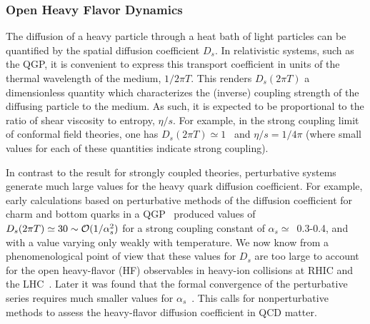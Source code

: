 \subsubsection{Open Heavy Flavor Dynamics}
	\label{Sec:OpenHF}

 The diffusion of a heavy particle through a heat bath of light particles can be 
 quantified by the spatial diffusion coefficient $D_s$. In 
 relativistic systems, such as the QGP, it is convenient to express this transport 
 coefficient in units of the thermal wavelength of the medium, $1/2\pi T$. This renders 
 $D_s(2\pi T)$ a dimensionless quantity which characterizes the (inverse) coupling 
 strength of the diffusing particle to the medium. As such, it is expected to be 
 proportional to the ratio of shear viscosity to entropy, $\eta/s$. For example, in 
 the strong coupling limit of conformal field theories, one has 
 $D_s(2\pi T) \simeq 1$~\cite{Herzog:2006gh,CasalderreySolana:2006rq} and 
 $\eta/s=1/4\pi$ (where small values for each of these quantities indicate strong coupling). 
 
In contrast to the result for strongly coupled theories, perturbative systems
generate much large values for the heavy quark diffusion coefficient. For example,
early calculations based on perturbative methods of the diffusion coefficient for charm and bottom quarks in 
 a QGP~\cite{Svetitsky:1987gq} produced values 
 of $D_s(2\pi T) \simeq 30 \sim {\cal O}(1/\alpha_s^2)$ for a strong coupling 
 constant of $\alpha_s\simeq$~0.3-0.4,  and with a value varying only weakly with temperature. 
 We now know from a 
 phenomenological point of view that these values for $D_s$ are too large to account for 
 the open heavy-flavor (HF) observables in heavy-ion collisions at RHIC and 
 the LHC~\cite{Rapp:2009my}. Later it was found that the formal convergence of the 
 perturbative series requires much smaller values for $\alpha_s$~\cite{CaronHuot:2008uh}. 
 This calls for nonperturbative methods to assess the heavy-flavor diffusion 
 coefficient in QCD matter.  
 
